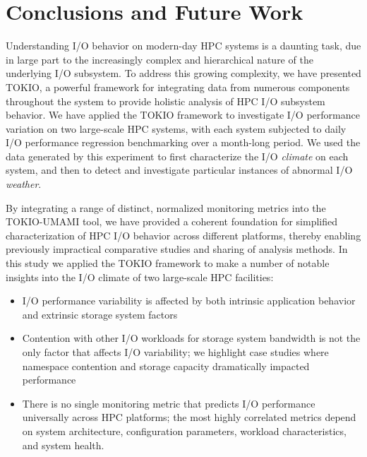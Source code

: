 \section{Conclusions and Future Work} \label{sec:conclusions}

Understanding I/O behavior on modern-day HPC systems is a daunting task, due in large part to the increasingly complex and hierarchical nature of the underlying I/O subsystem.
To address this growing complexity, we have presented TOKIO, a powerful framework for integrating data from numerous components throughout the system to provide holistic analysis of HPC I/O subsystem behavior.
We have applied the TOKIO framework to investigate I/O performance variation on two large-scale HPC systems, with each system subjected to daily I/O performance regression benchmarking over a month-long period.
We used the data generated by this experiment to first characterize the I/O \emph{climate} on each system, and then to detect and investigate particular instances of abnormal I/O \emph{weather}.

By integrating a range of distinct, normalized monitoring metrics into the
TOKIO-UMAMI tool, we have provided a coherent foundation for simplified
characterization of HPC I/O behavior across different platforms, thereby
enabling previously impractical comparative studies and sharing of analysis
methods. 
In this study we applied the TOKIO framework to make a number of notable
insights into the I/O climate of two large-scale HPC facilities:

\begin{itemize}
\item I/O performance variability is affected by both intrinsic application behavior and extrinsic storage system factors
\item Contention with other I/O workloads for storage system bandwidth is not the only factor that affects I/O variability; %
we highlight case studies where namespace contention and storage capacity dramatically impacted performance
\item There is no single monitoring metric that predicts I/O performance
universally across HPC platforms; the most highly correlated metrics depend
on system architecture, configuration parameters, workload characteristics,
and system health.
\end{itemize}

